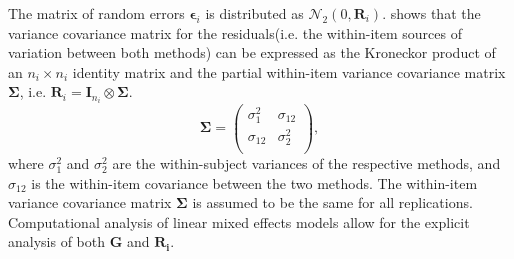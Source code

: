 \documentclass[12pt, a4paper]{report}
\theoremstyle{plain}
\theoremstyle{definition}
\theoremstyle{remark}
\begin{document}
		
		The matrix of random errors $\boldsymbol{\epsilon}_i$ is distributed as $\mathcal{N}_2(0,\boldsymbol{R}_i)$.
		\citet{hamlett} shows that the variance covariance matrix for the residuals(i.e. the within-item sources of variation between both methods) can be expressed as the Kroneckor product of an $n_i \times n_i$ identity matrix and the partial within-item variance covariance matrix $\boldsymbol{\Sigma}$, i.e. $\boldsymbol{R}_{i} = \boldsymbol{I}_{n_{i}} \otimes \boldsymbol{\Sigma}$.
		\[
		\boldsymbol{\Sigma} = \left( \begin{array}{cc}
		\sigma^2_{1} & \sigma_{12} \\
		\sigma_{12} & \sigma^2_{2} \\
		\end{array}\right),
		\]
		where $\sigma^2_{1}$ and $\sigma^2_{2}$ are the within-subject variances of the respective methods, and $\sigma_{12}$ is the within-item covariance between the two methods. The within-item variance covariance matrix $\boldsymbol{\Sigma}$ is assumed to be the same for all replications. Computational analysis of linear mixed effects models allow for the explicit analysis of both $\boldsymbol{G}$ and $\boldsymbol{R_i}$. 
		
\end{document}
